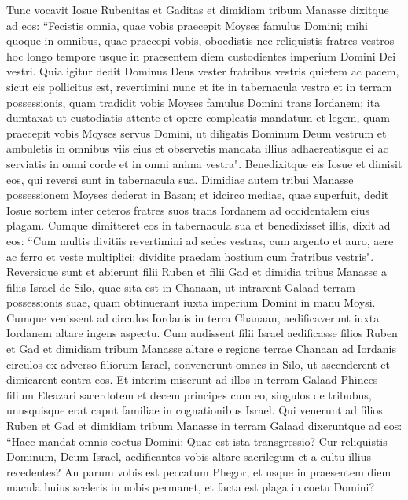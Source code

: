 \begin{biblechapter}  
\verse Tunc vocavit Iosue Rubenitas et Gaditas et dimidiam tribum Manasse 
\verse dixitque ad eos: “Fecistis omnia, quae vobis praecepit Moyses famulus Domini; mihi quoque in omnibus, quae praecepi vobis, oboedistis 
\verse nec reliquistis fratres vestros hoc longo tempore usque in praesentem diem custodientes imperium Domini Dei vestri. 
\verse Quia igitur dedit Dominus Deus vester fratribus vestris quietem ac pacem, sicut eis pollicitus est, revertimini nunc et ite in tabernacula vestra et in terram possessionis, quam tradidit vobis Moyses famulus Domini trans Iordanem; 
\verse ita dumtaxat ut custodiatis attente et opere compleatis mandatum et legem, quam praecepit vobis Moyses servus Domini, ut diligatis Dominum Deum vestrum et ambuletis in omnibus viis eius et observetis mandata illius adhaereatisque ei ac serviatis in omni corde et in omni anima vestra". 
\verse Benedixitque eis Iosue et dimisit eos, qui reversi sunt in tabernacula sua. 
\verse Dimidiae autem tribui Manasse possessionem Moyses dederat in Basan; et idcirco mediae, quae superfuit, dedit Iosue sortem inter ceteros fratres suos trans Iordanem ad occidentalem eius plagam. Cumque dimitteret eos in tabernacula sua et benedixisset illis, 
\verse dixit ad eos: “Cum multis divitiis revertimini ad sedes vestras, cum argento et auro, aere ac ferro et veste multiplici; dividite praedam hostium cum fratribus vestris". 
\verse Reversique sunt et abierunt filii Ruben et filii Gad et dimidia tribus Manasse a filiis Israel de Silo, quae sita est in Chanaan, ut intrarent Galaad terram possessionis suae, quam obtinuerant iuxta imperium Domini in manu Moysi. 
\verse Cumque venissent ad circulos Iordanis in terra Chanaan, aedificaverunt iuxta Iordanem altare ingens aspectu. 
\verse Cum audissent filii Israel aedificasse filios Ruben et Gad et dimidiam tribum Manasse altare e regione terrae Chanaan ad Iordanis circulos ex adverso filiorum Israel, 
\verse convenerunt omnes in Silo, ut ascenderent et dimicarent contra eos. 
\verse Et interim miserunt ad illos in terram Galaad Phinees filium Eleazari sacerdotem 
\verse et decem principes cum eo, singulos de tribubus, unusquisque erat caput familiae in cognationibus Israel. 
\verse Qui venerunt ad filios Ruben et Gad et dimidiam tribum Manasse in terram Galaad dixeruntque ad eos: 
\verse “Haec mandat omnis coetus Domini: Quae est ista transgressio? Cur reliquistis Dominum, Deum Israel, aedificantes vobis altare sacrilegum et a cultu illius recedentes? 
\verse An parum vobis est peccatum Phegor, et usque in praesentem diem macula huius sceleris in nobis permanet, et facta est plaga in coetu Domini? 

\end{biblechapter}
